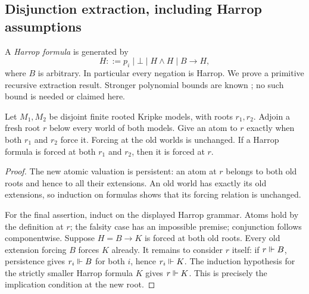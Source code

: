 \subsection{Disjunction extraction, including Harrop assumptions}

A \emph{Harrop formula} is generated by
\[
H::=p_i\mid\bot\mid H\wedge H\mid B\to H,
\]
where $B$ is arbitrary. In particular every negation is Harrop. We prove
a primitive recursive extraction result. Stronger polynomial bounds are
known \cite{buss-pudlak2001}; no such bound is needed or claimed here.

\begin{lemma}
\label{lem:ipc-gluing}
Let $M_1,M_2$ be disjoint finite rooted Kripke models, with roots $r_1,r_2$.
Adjoin a fresh root $r$ below every world of both models. Give an atom to
$r$ exactly when both $r_1$ and $r_2$ force it. Forcing at the old worlds
is unchanged. If a Harrop formula is forced at both $r_1$ and $r_2$, then
it is forced at $r$.
\end{lemma}
\begin{proof}
The new atomic valuation is persistent: an atom at $r$ belongs to both old
roots and hence to all their extensions. An old world has exactly its old
extensions, so induction on formulas shows that its forcing relation is
unchanged.

For the final assertion, induct on the displayed Harrop grammar. Atoms
hold by the definition at $r$; the falsity case has an impossible premise;
conjunction follows componentwise. Suppose $H=B\to K$ is forced at both
old roots. Every old extension forcing $B$ forces $K$ already. It remains
to consider $r$ itself: if $r\Vdash B$, persistence gives $r_i\Vdash B$
for both $i$, hence $r_i\Vdash K$. The induction hypothesis for the
strictly smaller Harrop formula $K$ gives $r\Vdash K$. This is precisely
the implication condition at the new root.
\end{proof}

